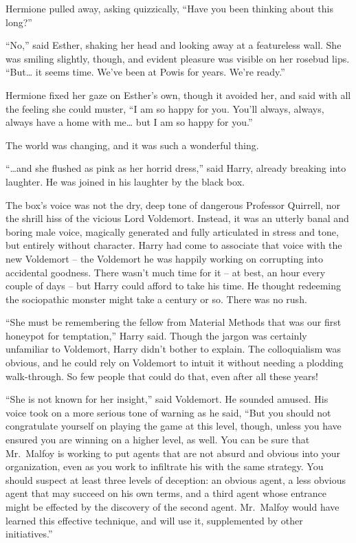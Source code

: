 Hermione pulled away, asking quizzically, ``Have you been thinking about
this long?''

``No,'' said Esther, shaking her head and looking away at a featureless
wall. She was smiling slightly, though, and evident pleasure was visible
on her rosebud lips. ``But\ldots{} it seems time. We've been at Powis
for years. We're ready.''

Hermione fixed her gaze on Esther's own, though it avoided her, and said
with all the feeling she could muster, ``I am so happy for you. You'll
always, always, always have a home with me\ldots{} but I am so happy for
you.''

The world was changing, and it was such a wonderful thing.

\mybreak

``\ldots and she flushed as pink as her horrid dress,'' said Harry,
already breaking into laughter. He was joined in his laughter by the
black box.

The box's voice was not the dry, deep tone of dangerous Professor
Quirrell, nor the shrill hiss of the vicious Lord Voldemort. Instead, it
was an utterly banal and boring male voice, magically generated and
fully articulated in stress and tone, but entirely without character.
Harry had come to associate that voice with the new Voldemort -- the
Voldemort he was happily working on corrupting into accidental goodness.
There wasn't much time for it -- at best, an hour every couple of days
-- but Harry could afford to take his time. He thought redeeming the
sociopathic monster might take a century or so. There was no rush.

``She must be remembering the fellow from Material Methods that was our
first honeypot for temptation,'' Harry said. Though the jargon was
certainly unfamiliar to Voldemort, Harry didn't bother to explain. The
colloquialism was obvious, and he could rely on Voldemort to intuit it
without needing a plodding walk-through. So few people that could do
that, even after all these years!

``She is not known for her insight,'' said Voldemort. He sounded amused.
His voice took on a more serious tone of warning as he said, ``But you
should not congratulate yourself on playing the game at this level,
though, unless you have ensured you are winning on a higher level, as
well. You can be sure that Mr.~Malfoy is working to put agents that are
not absurd and obvious into your organization, even as you work to
infiltrate his with the same strategy. You should suspect at least three
levels of deception: an obvious agent, a less obvious agent that may
succeed on his own terms, and a third agent whose entrance might be
effected by the discovery of the second agent. Mr.~Malfoy would have
learned this effective technique, and will use it, supplemented by other
initiatives.''

